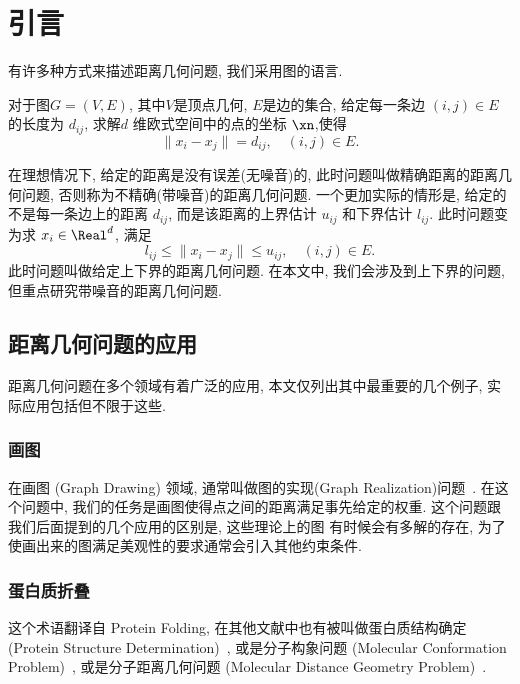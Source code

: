 \chapter{引言}
\label{cha:introduction}
有许多种方式来描述距离几何问题, 我们采用图的语言. 

\begin{Prob}[等式约束的距离几何问题]
  对于图$G=(V,E)$, 其中$V$是顶点几何, $E$是边的集合, 给定每一条边 $(i,j)\in E$ 的长度为 $d_{ij}$, 求解$d$ 维欧式空间中的点的坐标 $\xn$,使得
\begin{equation}
  \|x_i-x_j\|=d_{ij}, \quad (i,j)\in E.
\end{equation}
\end{Prob}

在理想情况下, 给定的距离是没有误差(无噪音)的, 
此时问题叫做精确距离的距离几何问题, 否则称为不精确(带噪音)的距离几何问题.
一个更加实际的情形是, 给定的不是每一条边上的距离 $d_{ij}$, 
而是该距离的上界估计 $u_{ij}$ 和下界估计  $l_{ij}$.
此时问题变为求 $x_i\in \Real ^d$, 满足
\begin{equation}
  l_{ij}\leq \|x_i-x_j\| \leq u_{ij}, \quad (i,j)\in E.
\end{equation}
此时问题叫做给定上下界的距离几何问题.
在本文中, 我们会涉及到上下界的问题, 但重点研究带噪音的距离几何问题.


\section{距离几何问题的应用}
\label{sec:application}
距离几何问题在多个领域有着广泛的应用, 
本文仅列出其中最重要的几个例子, 实际应用包括但不限于这些.


\subsection{画图}
在画图 (Graph Drawing) 领域, 通常叫做图的实现(Graph Realization)问题~\cite{Gansner2005}.
在这个问题中, 我们的任务是画图使得点之间的距离满足事先给定的权重. 
这个问题跟我们后面提到的几个应用的区别是, 这些理论上的图
有时候会有多解的存在, 为了使画出来的图满足美观性的要求通常会引入其他约束条件.

\subsection{蛋白质折叠} 
这个术语翻译自 Protein Folding, 
在其他文献中也有被叫做蛋白质结构确定 (Protein Structure Determination)~\cite{Braun1987,Sit2011,Voller2013}, 
或是分子构象问题 (Molecular Conformation Problem)~\cite{Crippen1988,Biswas2008,Fang2013}, 
或是分子距离几何问题 (Molecular Distance Geometry Problem)~\cite{Dong2002,Dong2003,Carvalho2008}.

